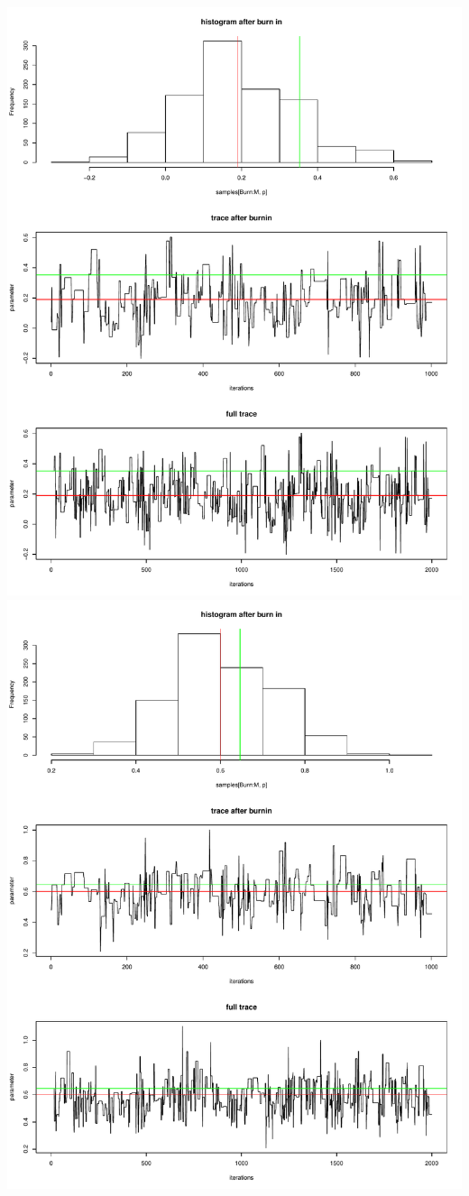\documentclass[a4paper,12pt]{scrartcl} %
\begin{document}
\clearpage
\includegraphics[scale=0.4]{5}  %
\includegraphics[scale=0.4]{6}
\end{document}

